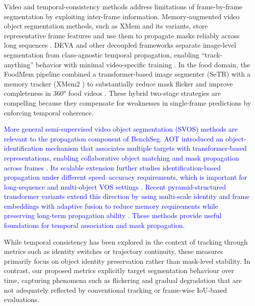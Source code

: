 \documentclass[preprint,12pt]{elsarticle}
\newcommand{\change}[1]{\textcolor{blue}{#1}}
\begin{document}
Video and temporal-consistency methods address limitations of frame-by-frame segmentation by exploiting inter-frame information. Memory-augmented video object segmentation methods, such as XMem \cite{cheng2022xmem} and its variants, store representative frame features and use them to propagate masks reliably across long sequences \cite{bekuzarov2023xmem++}. DEVA \cite{cheng2023tracking} and other decoupled frameworks separate image-level segmentation from class-agnostic temporal propagation, enabling “track-anything” behavior with minimal video-specific training \cite{cheng2023tracking}. In the food domain, the FoodMem \cite{almughrabi2025foodmem} pipeline combined a transformer-based image segmenter (SeTR) \cite{zheng2021rethinking} with a memory tracker (XMem2 \cite{bekuzarov2023xmem++}) to substantially reduce mask flicker and improve completeness in 360° food videos \cite{almughrabi2025foodmem}. These hybrid two-stage strategies are compelling because they compensate for weaknesses in single-frame predictions by enforcing temporal coherence.

\change{More general semi-supervised video object segmentation (SVOS) methods are relevant to the propagation component of BenchSeg. AOT introduced an object-identification mechanism that associates multiple targets with transformer-based representations, enabling collaborative object matching and mask propagation across frames \cite{yang2021associating}. Its scalable extension further studies identification-based propagation under different speed--accuracy requirements, which is important for long-sequence and multi-object VOS settings \cite{yang2024scalable}. Recent pyramid-structured transformer variants extend this direction by using multi-scale identity and frame embeddings with adaptive fusion to reduce memory requirements while preserving long-term propagation ability \cite{zhang2025pyramid}. These methods provide useful foundations for temporal association and mask propagation.}

While temporal consistency has been explored in the context of tracking through metrics such as identity switches or trajectory continuity, these measures primarily focus on object identity preservation rather than mask-level stability. In contrast, our proposed metrics explicitly target segmentation behaviour over time, capturing phenomena such as flickering and gradual degradation that are not adequately reflected by conventional tracking or frame-wise IoU-based evaluations.
\end{document}
